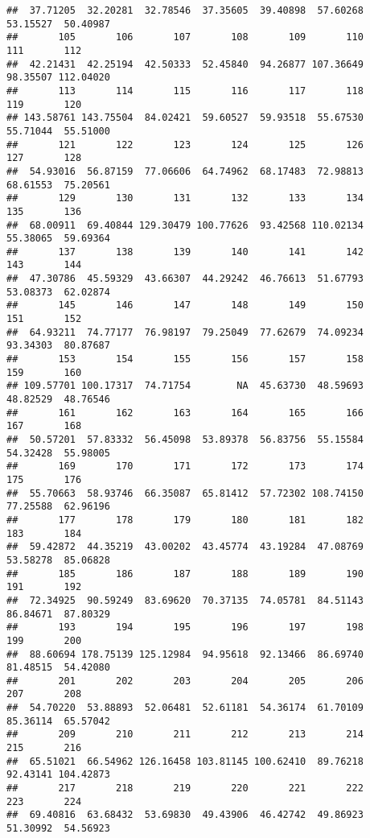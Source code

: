 \documentclass[
]{article}
\begin{document}
\begin{verbatim}
##  37.71205  32.20281  32.78546  37.35605  39.40898  57.60268  53.15527  50.40987 
##       105       106       107       108       109       110       111       112 
##  42.21431  42.25194  42.50333  52.45840  94.26877 107.36649  98.35507 112.04020 
##       113       114       115       116       117       118       119       120 
## 143.58761 143.75504  84.02421  59.60527  59.93518  55.67530  55.71044  55.51000 
##       121       122       123       124       125       126       127       128 
##  54.93016  56.87159  77.06606  64.74962  68.17483  72.98813  68.61553  75.20561 
##       129       130       131       132       133       134       135       136 
##  68.00911  69.40844 129.30479 100.77626  93.42568 110.02134  55.38065  59.69364 
##       137       138       139       140       141       142       143       144 
##  47.30786  45.59329  43.66307  44.29242  46.76613  51.67793  53.08373  62.02874 
##       145       146       147       148       149       150       151       152 
##  64.93211  74.77177  76.98197  79.25049  77.62679  74.09234  93.34303  80.87687 
##       153       154       155       156       157       158       159       160 
## 109.57701 100.17317  74.71754        NA  45.63730  48.59693  48.82529  48.76546 
##       161       162       163       164       165       166       167       168 
##  50.57201  57.83332  56.45098  53.89378  56.83756  55.15584  54.32428  55.98005 
##       169       170       171       172       173       174       175       176 
##  55.70663  58.93746  66.35087  65.81412  57.72302 108.74150  77.25588  62.96196 
##       177       178       179       180       181       182       183       184 
##  59.42872  44.35219  43.00202  43.45774  43.19284  47.08769  53.58278  85.06828 
##       185       186       187       188       189       190       191       192 
##  72.34925  90.59249  83.69620  70.37135  74.05781  84.51143  86.84671  87.80329 
##       193       194       195       196       197       198       199       200 
##  88.60694 178.75139 125.12984  94.95618  92.13466  86.69740  81.48515  54.42080 
##       201       202       203       204       205       206       207       208 
##  54.70220  53.88893  52.06481  52.61181  54.36174  61.70109  85.36114  65.57042 
##       209       210       211       212       213       214       215       216 
##  65.51021  66.54962 126.16458 103.81145 100.62410  89.76218  92.43141 104.42873 
##       217       218       219       220       221       222       223       224 
##  69.40816  63.68432  53.69830  49.43906  46.42742  49.86923  51.30992  54.56923 

\end{verbatim}
\end{document}
